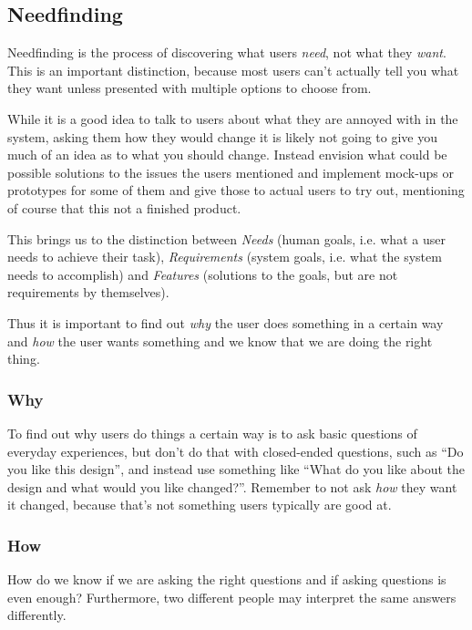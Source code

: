 \newpage
\subsection{Needfinding}
Needfinding is the process of discovering what users \textit{need}, not what they \textit{want}.
This is an important distinction, because most users can't actually tell you what they want unless presented with multiple options to choose from.

While it is a good idea to talk to users about what they are annoyed with in the system, asking them how they would change it is likely not going to give you much of an idea
as to what you should change. Instead envision what could be possible solutions to the issues the users mentioned and implement mock-ups or prototypes for some of them and
give those to actual users to try out, mentioning of course that this not a finished product.

This brings us to the distinction between {\color{red} \textit{Needs}} (human goals, i.e. what a user needs to achieve their task),
{\color{ForestGreen} \textit{Requirements}} (system goals, i.e. what the system needs to accomplish)
and {\color{Blue} \textit{Features}} (solutions to the goals, but are not requirements by themselves).

Thus it is important to find out \textit{why} the user does something in a certain way and \textit{how} the user wants something and we know that we are doing the right thing.

\subsubsection{Why}
To find out why users do things a certain way is to ask basic questions of everyday experiences, but don't do that with closed-ended questions,
such as ``Do you like this design'', and instead use something like ``What do you like about the design and what would you like changed?''.
Remember to not ask \textit{how} they want it changed, because that's not something users typically are good at.

\subsubsection{How}
How do we know if we are asking the right questions and if asking questions is even enough?
Furthermore, two different people may interpret the same answers differently.

